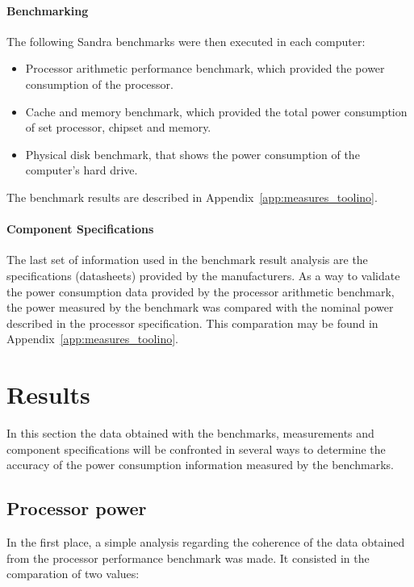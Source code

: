    \paragraph*{Benchmarking}
        The following Sandra benchmarks were then executed in each computer:
        \begin{itemize}
            \item Processor arithmetic performance benchmark, which provided the power consumption of the processor.
            \item Cache and memory benchmark, which provided the total power consumption of set processor, chipset and memory.
            \item Physical disk benchmark, that shows the power consumption of the computer's hard drive.
        \end{itemize}
            
        The benchmark results are described in Appendix~\ref{app:measures_toolino}.
            
    \paragraph*{Component Specifications}
        The last set of information used in the benchmark result analysis are the specifications (datasheets) provided by the  manufacturers.
        As a way to validate the power consumption data provided by the processor arithmetic benchmark, the power measured by the benchmark was compared with the nominal power described in the processor specification. This comparation may be found in Appendix~\ref{app:measures_toolino}.
                        
            
\section{Results} \label{sec4:results}
    In this section the data obtained with the benchmarks, measurements and component specifications will be confronted in several ways to determine the accuracy of the power consumption information measured by the benchmarks.
    
    \subsection{Processor power} \label{sec4:processor_power}
        In the first place, a simple analysis regarding the coherence of the data obtained from the processor performance benchmark was made. It consisted in the comparation of two values:
        
